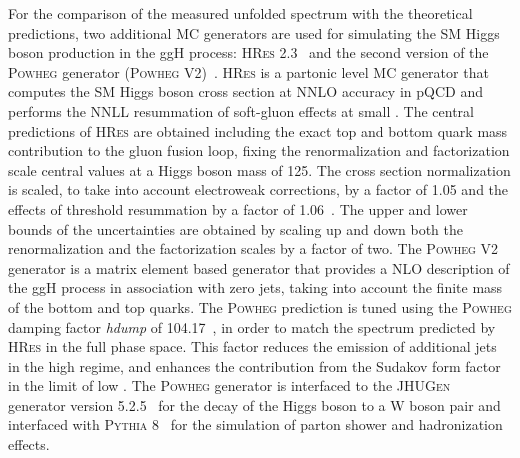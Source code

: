 For the comparison of the measured unfolded spectrum with the theoretical predictions, two additional MC generators are used for simulating the SM Higgs boson production in the ggH process: \textsc{HRes} 2.3~\cite{deFlorian:2012mx,Grazzini:2013mca} and the second version of the \textsc{Powheg} generator (\textsc{Powheg V2})~\cite{Bagnaschi:2011tu}.
\textsc{HRes} is a partonic level MC generator that computes the SM Higgs
boson cross section at NNLO accuracy in pQCD and performs the NNLL
resummation of soft-gluon effects at small \pt. The central predictions of
\textsc{HRes} are obtained including the exact top and bottom quark mass contribution to
the gluon fusion loop, fixing the renormalization and factorization scale central values at a Higgs boson mass of 125\GeV. The cross section normalization is scaled, to take into account electroweak corrections, by a factor of 1.05 and the effects of threshold resummation by a factor of 1.06~\cite{Actis:2008ug,Catani:2003zt}. The upper and lower bounds of the uncertainties are obtained by scaling up and down both the renormalization and the factorization scales by a factor of two.
The \textsc{Powheg V2} generator is a matrix element based generator that provides a NLO description of the ggH process in association with zero jets, taking into account the finite mass of the bottom and top quarks.
The \textsc{Powheg} prediction is tuned using the \textsc{Powheg} damping factor \textit{hdump} of 104.17~\GeV, in order to match the \pth{} spectrum predicted by \textsc{HRes} in the full phase space. This factor reduces the emission of additional jets in the high \pt regime, and enhances the contribution from the Sudakov form factor in the limit of low \pt.
The \textsc{Powheg} generator is interfaced to the \textsc{JHUGen} generator version 5.2.5~\cite{Gao:2010qx,Bolognesi:2012mm,Anderson:2013afp} for the decay of the Higgs boson to a W boson pair and interfaced with \textsc{Pythia 8}~\cite{Sjostrand:2007gs} for the simulation of parton shower and hadronization effects.
